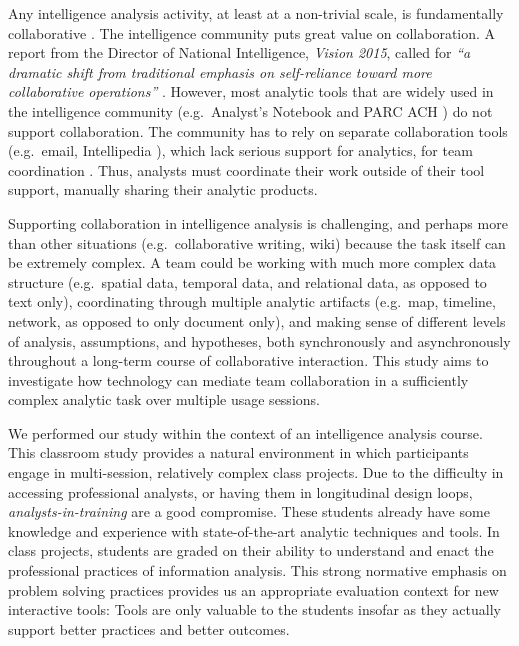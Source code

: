 Any intelligence analysis activity, at least at a non-trivial scale, is
fundamentally collaborative \cite{Convertino2011}. The intelligence community
puts great value on collaboration. A report from the Director of National Intelligence,
\emph{Vision 2015},  called for \emph{``a dramatic shift from traditional emphasis on
self-reliance toward more collaborative operations''} \cite[p.13]{Vision2015}.
However, most analytic tools that are widely used in the intelligence community
(e.g.~Analyst's Notebook \cite{IBM} and PARC ACH \cite{PARC}) do not support
collaboration. The community has to rely on separate collaboration tools (e.g.~email, Intellipedia \cite{Intelink2017}), which lack serious support for analytics, for team coordination \cite{Treverton2016}. Thus, analysts must coordinate their work outside
of their tool support, manually sharing their analytic products.

Supporting collaboration in intelligence analysis is challenging, and perhaps more than other situations (e.g.~collaborative writing, wiki) because the task itself can be extremely complex. A team could be working with much more complex data structure (e.g.~spatial data,
temporal data, and relational data, as opposed to text only), coordinating
through multiple analytic artifacts (e.g.~map, timeline, network, as opposed to
only document only), and making sense of different levels of analysis, assumptions,
and hypotheses, both synchronously and asynchronously throughout a long-term
course of collaborative interaction. This study aims to investigate how technology
can mediate team collaboration in a sufficiently complex analytic task over
multiple usage sessions.


We performed our study within
the context of an intelligence analysis course. This classroom study provides a
natural environment in which participants engage in multi-session, relatively
complex class projects. Due to the difficulty in accessing professional
analysts, or having them in longitudinal design loops,
\emph{analysts-in-training} are a good compromise. These students already have
some knowledge and experience with state-of-the-art analytic techniques and
tools. In class projects, students are graded on their ability to understand and
enact the professional practices of information analysis. This strong normative
emphasis on problem solving practices provides us an appropriate evaluation context for new
interactive tools: Tools are only valuable to the students insofar as they
actually support better practices and better outcomes.

